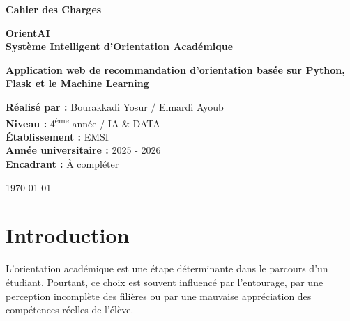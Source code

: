 \documentclass[12pt,a4paper]{report}
\begin{document}
\begin{titlepage}
    \centering
    \vspace*{2cm}
    
    {\Huge\bfseries\color{mainblue} Cahier des Charges\par}
    \vspace{0.7cm}
    {\LARGE\bfseries OrientAI\\[0.2cm] Système Intelligent d'Orientation Académique\par}
    
    \vspace{1.5cm}
    
    \begin{mybox}
    \centering
    \textbf{Application web de recommandation d'orientation basée sur Python, Flask et le Machine Learning}
    \end{mybox}
    
    \vspace{2cm}
    
    \begin{flushleft}
    \textbf{Réalisé par :} Bourakkadi Yosur / Elmardi Ayoub \\
    \textbf{Niveau :} 4\textsuperscript{ème} année / IA \& DATA \\
    \textbf{Établissement :} EMSI \\
    \textbf{Année universitaire :} 2025 - 2026 \\
    \textbf{Encadrant :} À compléter
    \end{flushleft}
    
    \vfill
    
    {\large \today \par}
\end{titlepage}

\tableofcontents
\newpage

\chapter*{Introduction}

L'orientation académique est une étape déterminante dans le parcours d'un étudiant. Pourtant, ce choix est souvent influencé par l'entourage, par une perception incomplète des filières ou par une mauvaise appréciation des compétences réelles de l'élève.
\end{document}
